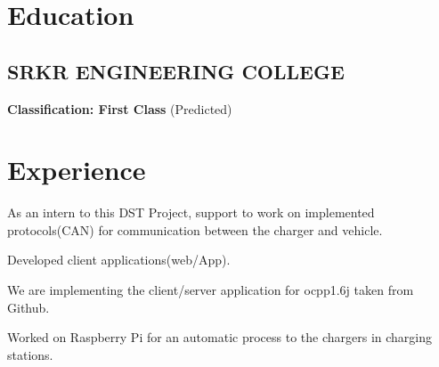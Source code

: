 \documentclass[]{deedy-resume-openfont}
\begin{document}
%
%

%
%
\begin{minipage}[t]{0.66\textwidth} 



\section{Education} 
\subsection{SRKR ENGINEERING COLLEGE}
\textbf{Classification: First Class} (Predicted)
\sectionsep



\section{Experience}
\vspace{\topsep} %
\begin{tightemize}
\item As an intern to this DST Project, support to work on implemented protocols(CAN) for communication between the charger and vehicle.
\item Developed client applications(web/App).
\item We are implementing the client/server application for ocpp1.6j taken from Github.
\item Worked on Raspberry Pi for an automatic process to the chargers in charging stations.
\end{tightemize}
\sectionsep


\end{minipage}
\end{document}
